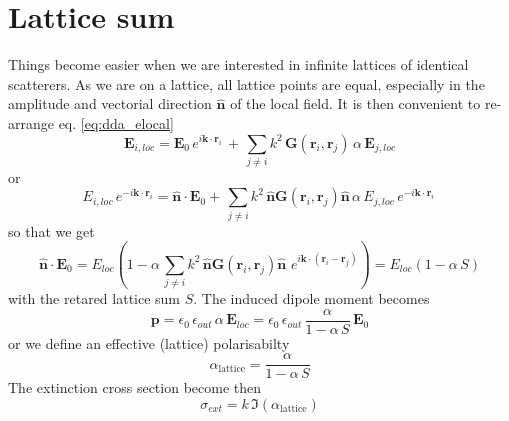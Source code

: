 \section{Lattice sum}

Things become easier when we are interested in infinite lattices of identical scatterers. As we are on a lattice, all lattice points are equal, especially in the amplitude and vectorial direction $\mathbf{\hat{n}}$ of the local field. It is then 
 convenient to re-arrange eq. \ref{eq:dda_elocal}
\begin{equation}
\mathbf{E}_{i, loc} =\mathbf{E}_{0} \, e^{i \mathbf{k} \cdot \mathbf{r}_i} \, +  \, 
 \sum_{j \neq i} k^2 \, 
\mathbf{G}(\mathbf{r}_i, \mathbf{r}_j) \,    \alpha \, \mathbf{E}_{j,loc}
\end{equation}
or
\begin{equation}
E_{i, loc}  \, e^{-i \mathbf{k} \cdot \mathbf{r}_i} =\mathbf{\hat{n}} \cdot \mathbf{E}_{0}  +  \, 
 \sum_{j \neq i} k^2 \, 
 \mathbf{\hat{n}} \mathbf{G}(\mathbf{r}_i, \mathbf{r}_j)  \mathbf{\hat{n}}\,    \alpha \, E_{j,loc} \, e^{-i \mathbf{k} \cdot \mathbf{r}_i} \,
\end{equation}
so that we get
\begin{equation}
\mathbf{\hat{n}} \cdot \mathbf{E}_{0} = 
E_{loc} \left( 1 -     \alpha  \,
 \sum_{j \neq i} k^2 \, 
 \mathbf{\hat{n}} \mathbf{G}(\mathbf{r}_i, \mathbf{r}_j)  \mathbf{\hat{n}}\,     \, e^{i \mathbf{k} \cdot ( \mathbf{r}_i - \mathbf{r}_j  ) } \right)
 = 
 {E}_{loc} \left( 1 -     \alpha  \, S \right)
\end{equation}
with the retared lattice sum $S$. The induced
dipole moment becomes 
\begin{equation}
\mathbf{p} = \epsilon_0 \, \epsilon_{out} \, \alpha \, \mathbf{E}_{loc} =  \epsilon_0 \, \epsilon_{out} \, \frac{\alpha}{ 1 -     \alpha  \, S } \,
  \mathbf{E}_{0} 
\end{equation} 
or  we define an effective (lattice) polarisabilty
\begin{equation}
\alpha_\text{lattice} = \frac{\alpha}{ 1 -     \alpha  \, S } 
\end{equation} 
The extinction cross section become then
\begin{equation}
\sigma_{ext} = k \, \Im(\alpha_\text{lattice}) 
\end{equation}



\printbibliography[segment=\therefsegment,heading=subbibliography]




